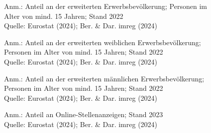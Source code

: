 \begin{figure}[p]
	{\centering {}}
	\label{map:potential}
	\begin{spacing}{1} \scriptsize
		Anm.: Anteil an der erweiterten Erwerbsbevölkerung; Personen im Alter von mind. 15 Jahren; Stand 2022\\
		Quelle: Eurostat (2024); Ber. \& Dar. imreg (2024) \end{spacing}
\end{figure}


\begin{figure}[p]
	{\centering {}}
	\label{map:potentialfrauen}
	\begin{spacing}{1} \scriptsize
		Anm.: Anteil an der erweiterten weiblichen Erwerbsbevölkerung; Personen im Alter von mind. 15 Jahren; Stand 2022\\
		Quelle: Eurostat (2024); Ber. \& Dar. imreg (2024) \end{spacing}
\end{figure}


\begin{figure}[p]
	{\centering {}}
	\label{map:potentialmaenner}
	\begin{spacing}{1} \scriptsize
		Anm.: Anteil an der erweiterten männlichen Erwerbsbevölkerung; Personen im Alter von mind. 15 Jahren; Stand 2022\\
		Quelle: Eurostat (2024); Ber. \& Dar. imreg (2024) \end{spacing}
\end{figure}


\begin{figure}[p]
	{\centering {}}
	\label{map:ikt}
	\begin{spacing}{1} \scriptsize
		Anm.: Anteil an Online-Stellenanzeigen; Stand 2023\\
		Quelle: Eurostat (2024); Ber. \& Dar. imreg (2024) \end{spacing}
\end{figure}


